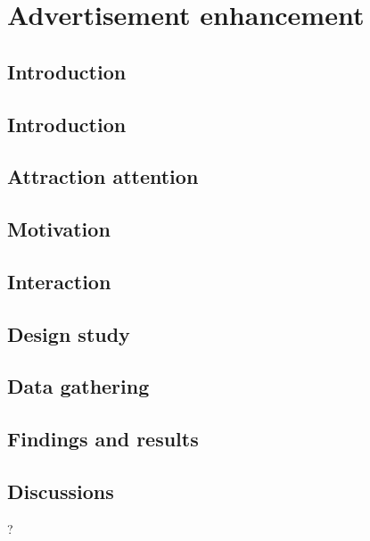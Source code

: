 \chapter{Advertisement enhancement} %

\label{Chapter9} %

\section{Introduction}


\section{Introduction}
\section{Attraction attention}
\section{Motivation}
\section{Interaction}
\section{Design study}
\section{Data gathering}
\section{Findings and results}
\section{Discussions}
?
